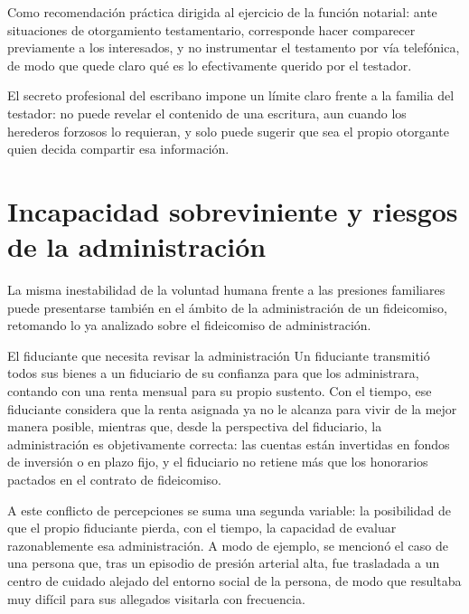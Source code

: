 \documentclass[12pt,oneside]{book}
\begin{document}
\begin{important}
Como recomendación práctica dirigida al ejercicio de la función notarial: ante situaciones de otorgamiento testamentario, corresponde hacer comparecer previamente a los interesados, y no instrumentar el testamento por vía telefónica, de modo que quede claro qué es lo efectivamente querido por el testador.
\end{important}

\begin{note}
El secreto profesional del escribano impone un límite claro frente a la familia del testador: no puede revelar el contenido de una escritura, aun cuando los herederos forzosos lo requieran, y solo puede sugerir que sea el propio otorgante quien decida compartir esa información.
\end{note}

\section{Incapacidad sobreviniente y riesgos de la administración}

La misma inestabilidad de la voluntad humana frente a las presiones familiares puede presentarse también en el ámbito de la administración de un fideicomiso, retomando lo ya analizado sobre el fideicomiso de administración.

\begin{example}{El fiduciante que necesita revisar la administración}
Un fiduciante transmitió todos sus bienes a un fiduciario de su confianza para que los administrara, contando con una renta mensual para su propio sustento. Con el tiempo, ese fiduciante considera que la renta asignada ya no le alcanza para vivir de la mejor manera posible, mientras que, desde la perspectiva del fiduciario, la administración es objetivamente correcta: las cuentas están invertidas en fondos de inversión o en plazo fijo, y el fiduciario no retiene más que los honorarios pactados en el contrato de fideicomiso.

A este conflicto de percepciones se suma una segunda variable: la posibilidad de que el propio fiduciante pierda, con el tiempo, la capacidad de evaluar razonablemente esa administración. A modo de ejemplo, se mencionó el caso de una persona que, tras un episodio de presión arterial alta, fue trasladada a un centro de cuidado alejado del entorno social de la persona, de modo que resultaba muy difícil para sus allegados visitarla con frecuencia.
\end{example}
\end{document}
